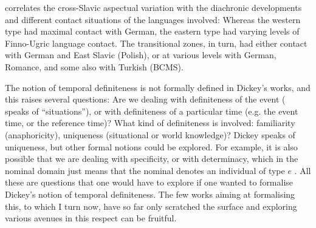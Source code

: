 \documentclass[output=paper,colorlinks,citecolor=brown]{langscibook}
\begin{document}

\citet{dickey15} correlates the cross-Slavic aspectual variation with the diachronic developments and different contact situations of the languages involved: Whereas the western type had maximal contact with German, the eastern type had varying levels of Finno-Ugric language contact. The transitional zones, in turn, had either contact with German and East Slavic (Polish), or at various levels with German, Romance, and some also with Turkish (BCMS). 

The notion of temporal definiteness is not formally defined in Dickey's works, and this raises several questions: Are we dealing with definiteness of the event (\citeauthor{Dickey2000} speaks of ``situations''), or with definiteness of a particular time (e.g. the event time, or the reference time)? What kind of definiteness is involved: familiarity (anaphoricity), uniqueness (situational or world knowledge)? Dickey speaks of uniqueness, but other formal notions could be explored. For example, it is also possible that we are dealing with specificity, or with determinacy, which in the nominal domain just means that the nominal denotes an individual of type $e$ \citep[see][]{coppockbeaver15}. All these are questions that one would have to explore if one wanted to formalise Dickey's notion of temporal definiteness. The few works aiming at formalising this, to which I turn now, have so far only scratched the surface and exploring various avenues in this respect can be fruitful. %
\end{document}
